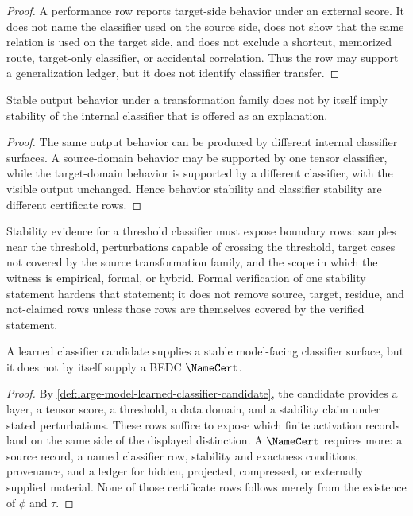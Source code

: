\begin{proof}
A performance row reports target-side behavior under an external score.
It does not name the classifier used on the source side, does not show
that the same relation is used on the target side, and does not exclude a
shortcut, memorized route, target-only classifier, or accidental
correlation. Thus the row may support a generalization ledger, but it
does not identify classifier transfer.
\end{proof}

\begin{theorem}
\label{thm:large-model-behavioral-stability-not-classifier-stability}
Stable output behavior under a transformation family does not by itself
imply stability of the internal classifier that is offered as an
explanation.
\end{theorem}

\begin{proof}
The same output behavior can be produced by different internal
classifier surfaces. A source-domain behavior may be supported by one
tensor classifier, while the target-domain behavior is supported by a
different classifier, with the visible output unchanged. Hence behavior
stability and classifier stability are different certificate rows.
\end{proof}

\begin{principle}
\label{prin:large-model-boundary-rows-for-stability}
Stability evidence for a threshold classifier must expose boundary rows:
samples near the threshold, perturbations capable of crossing the
threshold, target cases not covered by the source transformation family,
and the scope in which the witness is empirical, formal, or hybrid.
Formal verification of one stability statement hardens that statement;
it does not remove source, target, residue, and not-claimed rows unless
those rows are themselves covered by the verified statement.
\end{principle}

\begin{theorem}
\label{thm:large-model-tensor-classifier-certificate-ready}
A learned classifier candidate supplies a stable model-facing classifier
surface, but it does not by itself supply a BEDC $\NameCert$.
\end{theorem}

\begin{proof}
By \autoref{def:large-model-learned-classifier-candidate}, the candidate
provides a layer, a tensor score, a threshold, a data domain, and a
stability claim under stated perturbations. These rows suffice to expose
which finite activation records land on the same side of the displayed
distinction. A $\NameCert$ requires more: a source record, a named
classifier row, stability and exactness conditions, provenance, and a
ledger for hidden, projected, compressed, or externally supplied
material. None of those certificate rows follows merely from the
existence of $\phi$ and $\tau$.
\end{proof}

